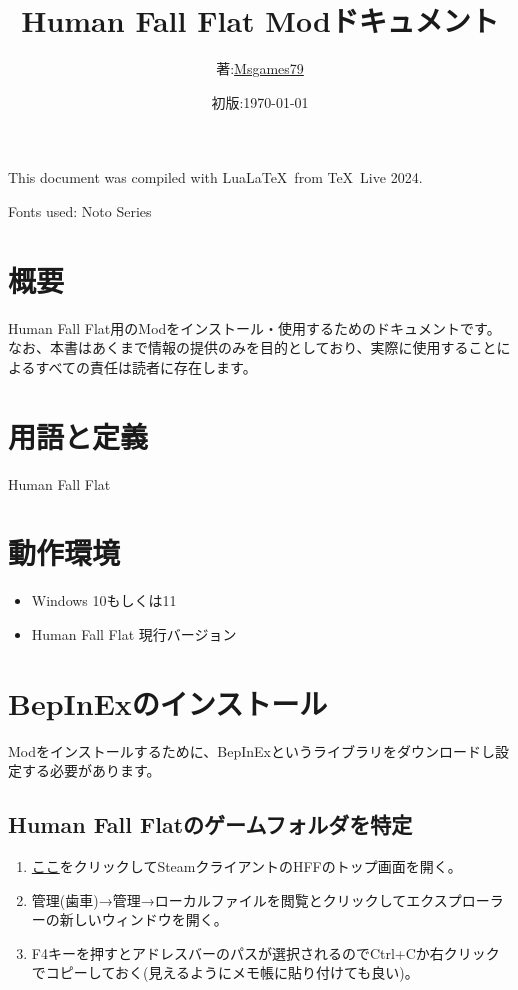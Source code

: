 \documentclass[lualatex,a4paper,fontsize=11pt,jafontscale=0.9247,titlepage,oneside]{jlreq}
\begin{document}
\title{Human Fall Flat Modドキュメント}
\author{著:\;\href{https://www.youtube.com/channel/UCKpnq5EXLCcuPsEGAjyXbsg}{Msgames79}}
\date{初版:\;\today}
\maketitle
This document was compiled with Lua\LaTeX\ from \TeX\ Live 2024.\par
Fonts used: Noto Series
\tableofcontents
\clearpage
\section{概要}
Human Fall Flat用のModをインストール・使用するためのドキュメントです。なお、本書はあくまで情報の提供のみを目的としており、実際に使用することによるすべての責任は読者に存在します。
\section{用語と定義}
\begin{description}
\item[Human Fall Flat]
\end{description}
\section{動作環境}
\begin{itemize}
\item Windows 10もしくは11
\item Human Fall Flat 現行バージョン
\end{itemize}
\section{BepInExのインストール}
Modをインストールするために、BepInExというライブラリをダウンロードし設定する必要があります。
\subsection{Human Fall Flatのゲームフォルダを特定}
\begin{enumerate}
\item \href{steam://open/games/details/477160}{ここ}をクリックしてSteamクライアントのHFFのトップ画面を開く。
\item \label{4.1.2}管理(歯車)→管理→ローカルファイルを閲覧とクリックしてエクスプローラーの新しいウィンドウを開く。
\item \label{4.1.3}F4キーを押すとアドレスバーのパスが選択されるのでCtrl+Cか右クリックでコピーしておく(見えるようにメモ帳に貼り付けても良い)。
\end{enumerate}
\end{document}
